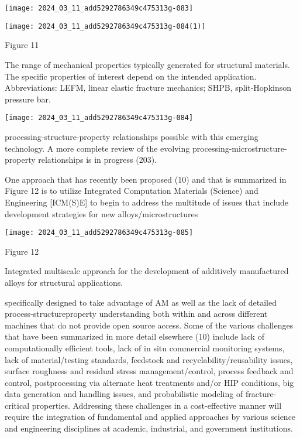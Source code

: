 \documentclass[10pt]{article}
\begin{document}
\begin{center}
\texttt{[image: 2024\_03\_11\_add5292786349c475313g-083]}
\end{center}

\begin{center}
\texttt{[image: 2024\_03\_11\_add5292786349c475313g-084(1)]}
\end{center}

Figure 11

The range of mechanical properties typically generated for structural materials. The specific properties of interest depend on the intended application. Abbreviations: LEFM, linear elastic fracture mechanics; SHPB, split-Hopkinson pressure bar.

\begin{center}
\texttt{[image: 2024\_03\_11\_add5292786349c475313g-084]}
\end{center}

processing-structure-property relationships possible with this emerging technology. A more complete review of the evolving processing-microstructure-property relationships is in progress (203).

One approach that has recently been proposed (10) and that is summarized in Figure 12 is to utilize Integrated Computation Materials (Science) and Engineering [ICM(S)E] to begin to address the multitude of issues that include development strategies for new alloys/microstructures

\begin{center}
\texttt{[image: 2024\_03\_11\_add5292786349c475313g-085]}
\end{center}

Figure 12

Integrated multiscale approach for the development of additively manufactured alloys for structural applications.

specifically designed to take advantage of AM as well as the lack of detailed process-structureproperty understanding both within and across different machines that do not provide open source access. Some of the various challenges that have been summarized in more detail elsewhere (10) include lack of computationally efficient tools, lack of in situ commercial monitoring systems, lack of material/testing standards, feedstock and recyclability/reusability issues, surface roughness and residual stress management/control, process feedback and control, postprocessing via alternate heat treatments and/or HIP conditions, big data generation and handling issues, and probabilistic modeling of fracture-critical properties. Addressing these challenges in a cost-effective manner will require the integration of fundamental and applied approaches by various science and engineering disciplines at academic, industrial, and government institutions.
\end{document}
